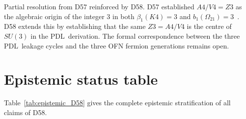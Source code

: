 \documentclass[11pt,a4paper]{article}
\def\Vfour{V4}%
\def\Afour{A4}%
\def\Zthree{Z3}%
\def\SUthree{SU(3)}%
\def\Kfour{K4}%
\def\PDL{PDL}%
\def\cong{=}%
\def\mathbb#1{#1}%
\def\mathrm#1{#1}%
\def\textsc#1{#1}%
\theoremstyle{plain}
\theoremstyle{definition}
\theoremstyle{remark}
\newenvironment{resolvedproblem}[1][]{%
  \begin{tcolorbox}[resolvedstyle,title={Resolved: #1}]}{\end{tcolorbox}}
\newcommand{\PDL}{\textsc{PDL}}
\newcommand{\Kfour}{K_4}
\newcommand{\Afour}{A_4}
\newcommand{\Vfour}{V_4}
\newcommand{\Zthree}{\mathbb{Z}_3}
\newcommand{\SUthree}{\mathrm{SU}(3)}
\begin{document}
\begin{resolvedproblem}[OP-OFN-1 (partial) --- $\beta_1 = 3$ as a shared invariant]
\textcolor{proofblue}{Partial resolution from D57 reinforced by D58.} D57 established $\Afour/\Vfour \cong \Zthree$ as the algebraic origin of the integer 3 in both $\beta_1(\Kfour) = 3$ and $b_1(\Omega_{21}) = 3$~\cite{PDL_N01}. D58 extends this by establishing that the same $\Zthree = \Afour/\Vfour$ is the centre of $\SUthree$ in the \PDL\ derivation. The formal correspondence between the three \PDL\ leakage cycles and the three OFN fermion generations remains open.
\end{resolvedproblem}

\section{Epistemic status table}
\label{sec:epistemic}

Table~\ref{tab:epistemic_D58} gives the complete epistemic stratification of all claims of D58.
\end{document}
